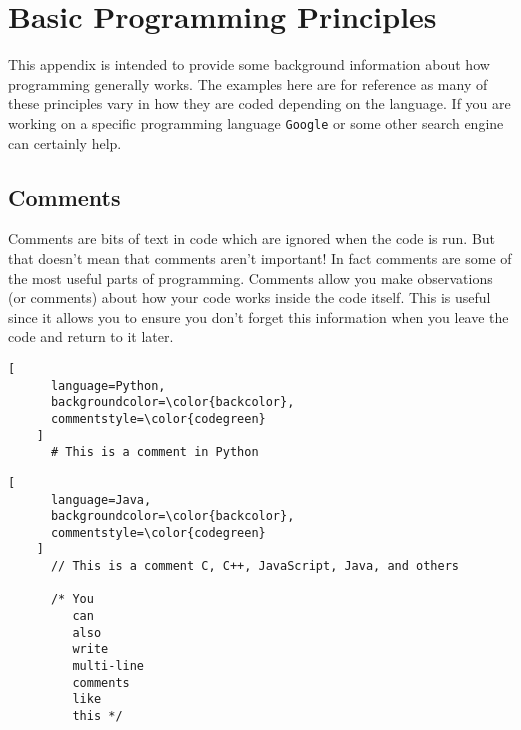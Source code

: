 \chapter{Basic Programming Principles}
\label{app:programming_basics}

  This appendix is intended to provide some background information about how programming generally works.
  The examples here are for reference as many of these principles vary in how they are coded depending on the language.
  If you are working on a specific programming language \texttt{Google} or some other search engine can certainly help.

  \section{Comments}
  \label{sec:basics_comments}

    Comments are bits of text in code which are ignored when the code is run.
    But that doesn't mean that comments aren't important!
    In fact comments are some of the most useful parts of programming.
    Comments allow you make observations (or comments) about how your code works inside the code itself.
    This is useful since it allows you to ensure you don't forget this information when you leave the code and return to it later.

    \begin{lstlisting}[
      language=Python,
      backgroundcolor=\color{backcolor},
      commentstyle=\color{codegreen}
    ]
      # This is a comment in Python
    \end{lstlisting}

    \begin{lstlisting}[
      language=Java,
      backgroundcolor=\color{backcolor},
      commentstyle=\color{codegreen}
    ]
      // This is a comment C, C++, JavaScript, Java, and others

      /* You 
         can
         also 
         write
         multi-line 
         comments
         like
         this */
    \end{lstlisting}